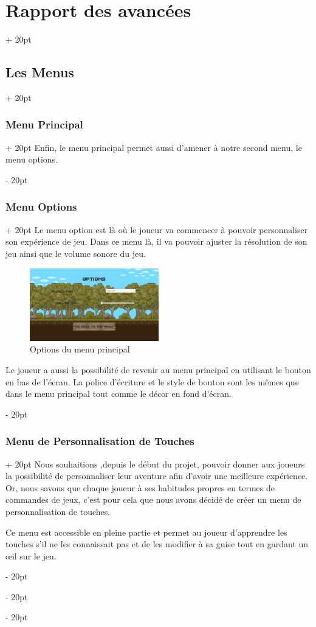\documentclass[a4paper, 12pt, twoside]{article}
\newcommand{\ind}[1][20pt]{\advance\leftskip + #1}
\newcommand{\deind}[1][20pt]{\advance\leftskip - #1}
\newenvironment{indt}[2][20pt]{#2 \par \ind[#1]}{\par \deind} %
\begin{document}
\begin{indt}{\section{Rapport des avancées}}
\begin{indt}{\subsection{Les Menus}}
\begin{indt}{\subsubsection{Menu Principal}}
                Enfin, le menu principal permet aussi d'amener à notre second menu, le menu options.
            \end{indt}

            \begin{indt}{\subsubsection{Menu Options}}
                Le menu option est là où le joueur va commencer à pouvoir personnaliser son expérience de jeu. Dans ce menu là, il va pouvoir ajuster la résolution de son jeu ainsi que le volume sonore du jeu.

                \begin{figure}[h]
                    \centering
                    \includegraphics[width=0.5\textwidth]{Menu2.png}
                    \caption{Options du menu principal}
                    \label{fig:mesh1}
                \end{figure}

                Le joueur a aussi la possibilité de revenir au menu principal en utilisant le bouton en bas de l’écran. La police d'écriture et le style de bouton sont les mêmes que dans le menu principal tout comme le décor en fond d’écran.
            \end{indt}

            \begin{indt}{\subsubsection{Menu de Personnalisation de Touches}}
                Nous souhaitions ,depuis le début du projet, pouvoir donner aux joueurs la possibilité de personnaliser leur aventure afin d'avoir une meilleure expérience. Or, nous savons que chaque joueur à ses habitudes propres en termes de commandes de jeux, c’est pour cela que nous avons décidé de créer un menu de personnalisation de touches.

                Ce menu est accessible en pleine partie et permet au joueur d’apprendre les touches s’il ne les connaissait pas et de les modifier à sa guise tout en gardant un œil sur le jeu.


\end{indt}
\end{indt}
\end{indt}
\end{document}
